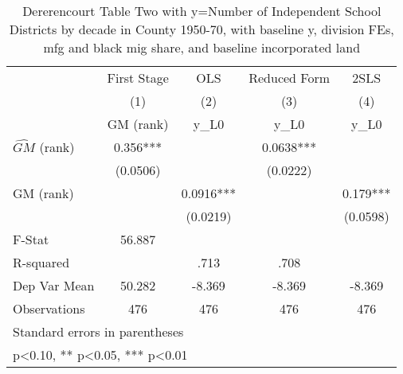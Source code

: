 \begin{table}[htbp]\centering
\def\sym#1{\ifmmode^{#1}\else\(^{#1}\)\fi}
\caption{Dererencourt Table Two with y=Number of Independent School Districts by decade in County 1950-70, with baseline y, division FEs, mfg and black mig share, and baseline incorporated land}
\begin{tabular}{l*{4}{c}}
\toprule
                    & First Stage   &         OLS   &Reduced Form   &        2SLS   \\
                    &\multicolumn{1}{c}{(1)}&\multicolumn{1}{c}{(2)}&\multicolumn{1}{c}{(3)}&\multicolumn{1}{c}{(4)}\\
                    &\multicolumn{1}{c}{GM  (rank)}&\multicolumn{1}{c}{y\_L0}&\multicolumn{1}{c}{y\_L0}&\multicolumn{1}{c}{y\_L0}\\
\midrule
$\hat{GM}$ (rank)   &       0.356***&               &      0.0638***&               \\
                    &    (0.0506)   &               &    (0.0222)   &               \\
\addlinespace
GM  (rank)          &               &      0.0916***&               &       0.179***\\
                    &               &    (0.0219)   &               &    (0.0598)   \\
\midrule
F-Stat              &      56.887   &               &               &               \\
R-squared           &               &        .713   &        .708   &               \\
Dep Var Mean        &      50.282   &      -8.369   &      -8.369   &      -8.369   \\
Observations        &         476   &         476   &         476   &         476   \\
\bottomrule
\multicolumn{5}{l}{\footnotesize Standard errors in parentheses}\\
\multicolumn{5}{l}{\footnotesize * p<0.10, ** p<0.05, *** p<0.01}\\
\end{tabular}
\end{table}
